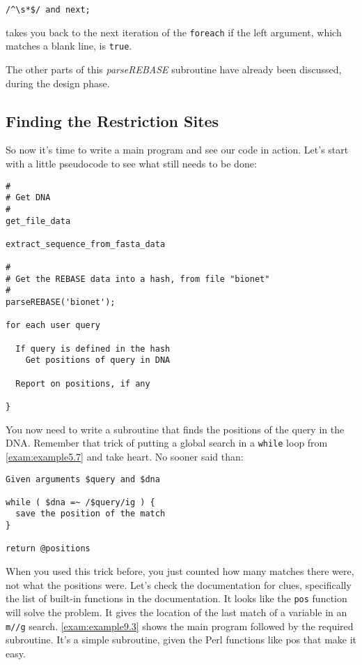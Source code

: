 \begin{lstlisting}
/^\s*$/ and next;
\end{lstlisting}

takes you back to the next iteration of the \verb|foreach| if the left
argument, which matches a blank line, is \verb|true|.

The other parts of this \textit{parseREBASE} subroutine have already been
discussed, during the design phase. 

\subsection{Finding the Restriction Sites}
So now it's time to write a main program and see our code in action. Let's start with a little pseudocode to see what still needs to be done: 

\begin{lstlisting}
#
# Get DNA
#
get_file_data

extract_sequence_from_fasta_data

#
# Get the REBASE data into a hash, from file "bionet"
#
parseREBASE('bionet');

for each user query

  If query is defined in the hash
    Get positions of query in DNA

  Report on positions, if any

}
\end{lstlisting}

You now need to write a subroutine that finds the positions of the query in the DNA. Remember that trick of putting a global search in a \verb|while| loop from \autoref{exam:example5.7} and take heart. No sooner said than: 

\begin{lstlisting}
Given arguments $query and $dna

while ( $dna =~ /$query/ig ) {
  save the position of the match
}

return @positions
\end{lstlisting}

When you used this trick before, you just counted how many matches there were, not what the positions were. Let's check the documentation for clues, specifically the list of built-in functions in the documentation.  It looks like the \verb|pos| function will solve the problem. It gives the location of the last match of a variable in an \verb|m//g| search.  \autoref{exam:example9.3} shows the main program followed by the required subroutine. It's a simple subroutine, given the Perl functions like pos that make it easy. 

